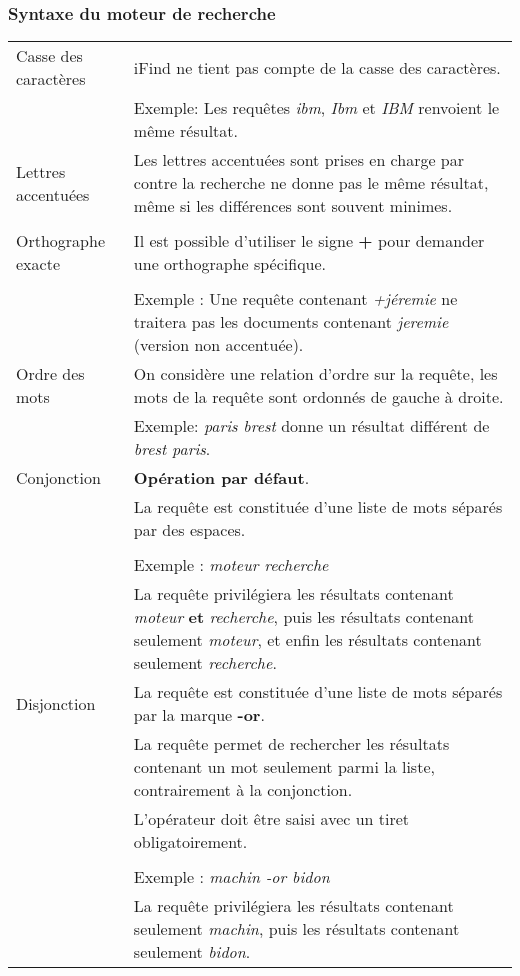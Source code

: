 \subsubsection{Syntaxe du moteur de recherche}

\begin{longtable}{| p{3.5cm} | p{9cm} |}

\hline
Casse des caractères & iFind ne tient pas compte de la casse des caractères.\\
& Exemple: Les requêtes \textit{ibm}, \textit{Ibm} et \textit{IBM} renvoient le même résultat.\\

\hline
Lettres accentuées & Les lettres accentuées sont prises en charge par contre la recherche ne donne pas le même résultat, même si les différences
sont souvent minimes.\\
& \\

\hline
Orthographe exacte & Il est possible d'utiliser le signe \textbf{+} pour demander une orthographe spécifique. \\
& \\
& Exemple : Une requête contenant \textit{+jéremie} ne traitera pas 
les documents contenant \textit{jeremie} (version non accentuée).\\

\hline
Ordre des mots & On considère une relation d'ordre sur la requête, les mots de la requête sont ordonnés de gauche à droite.\\
& Exemple: \textit{paris brest} donne un résultat différent de \textit{brest paris}.\\

\hline
Conjonction & \textbf{Opération par défaut}.\\
& La requête est constituée d'une liste de mots séparés par des espaces.\\
& \\
& Exemple : \textit{moteur recherche}\\
& La requête privilégiera les résultats 
contenant \textit{moteur} \textbf{et} \textit{recherche}, 
puis les résultats contenant seulement \textit{moteur},
et enfin les résultats contenant seulement \textit{recherche}.\\

\hline
Disjonction & La requête est constituée d'une liste de mots séparés par la marque \textbf{-or}.\\
& La requête permet de rechercher les résultats contenant un mot seulement parmi la liste,
contrairement à la conjonction.\\
& L'opérateur doit être saisi avec un tiret obligatoirement.\\
& \\
& Exemple : \textit{machin -or bidon}\\
& La requête privilégiera les résultats contenant seulement \textit{machin},
puis les résultats contenant seulement \textit{bidon}.\\


\end{longtable}
